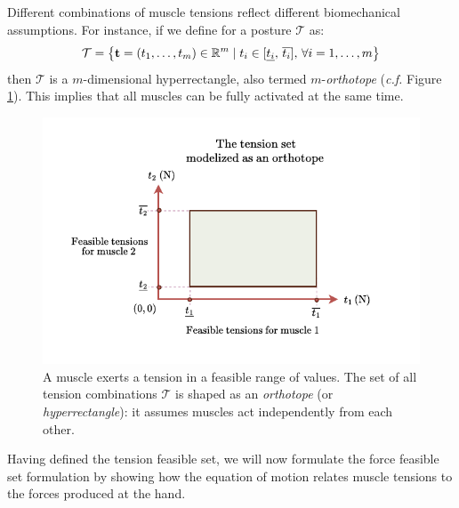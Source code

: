 Different combinations of muscle tensions reflect different biomechanical assumptions. For instance, if we define for a posture $\mathcal{T}$ as:
\begin{align*}
    \mathcal{T} = \left\{ \mathbf{t}=(t_1,\dots,t_m)\in\mathbb{R}^m \mid t_i \in [\underline{t_i}, \, \overline{t_i}],\, \forall i=1,\dots, m \right\}
\end{align*} 
then $\mathcal{T}$ is a $m$-dimensional hyperrectangle, also termed $m$-\emph{orthotope} (\emph{c.f.} Figure \ref{fig:tension_set_orthotope_example}). This implies that all muscles can be fully activated at the same time.
\begin{figure}[!htb]
    \captionsetup{justification=centering}
    \centering
    \includegraphics[trim={25 20 40 16}, clip, width=0.6\linewidth]{img/chapter_2/tension_set_orthotope.pdf}
    \caption{A muscle exerts a tension in a feasible range of values. The set of all tension combinations $\mathcal{T}$ is shaped as an \emph{orthotope} (or \emph{hyperrectangle}): it assumes muscles act independently from each other.}
    \label{fig:tension_set_orthotope_example}
\end{figure}

Having defined the tension feasible set, we will now formulate the force feasible set formulation by showing how the equation of motion relates muscle tensions to the forces produced at the hand.

